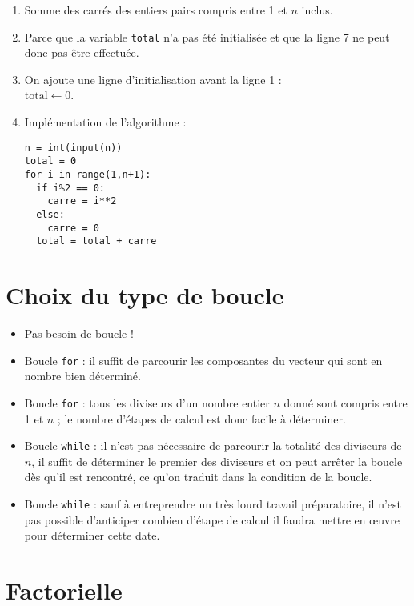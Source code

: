 \begin{enumerate}
 \item Somme des carrés des entiers pairs compris entre 1 et $n$ inclus.
 
 \item Parce que la variable \texttt{total} n'a pas été initialisée et que la ligne 7 ne peut donc pas être effectuée.
 
 \item On ajoute une ligne d'initialisation avant la ligne 1 :\\
 $\text{total} \leftarrow 0$.
 
 \item Implémentation de l'algorithme :
 
\begin{verbatim}
n = int(input(n))
total = 0
for i in range(1,n+1):
  if i%2 == 0:
    carre = i**2
  else:
    carre = 0
  total = total + carre
\end{verbatim}
 
\end{enumerate}

\section{Choix du type de boucle}

\begin{itemize}
 \item Pas besoin de boucle !
 \item Boucle \texttt{for} : il suffit de parcourir les composantes du vecteur qui sont en nombre bien déterminé.
 \item Boucle \texttt{for} : tous les diviseurs d'un nombre entier $n$ donné sont compris entre 1 et $n$ ; le nombre d'étapes de calcul est donc facile à déterminer.
 \item Boucle \texttt{while} : il n'est pas nécessaire de parcourir la totalité des diviseurs de $n$, il suffit de déterminer le premier des diviseurs et on peut arrêter la boucle dès qu'il est rencontré, ce qu'on traduit dans la condition de la boucle. 
 \item Boucle \texttt{while} : sauf à entreprendre un très lourd travail préparatoire, il n'est pas possible d'anticiper combien d'étape de calcul il faudra mettre en œuvre pour déterminer cette date.
\end{itemize}

\section{Factorielle}

